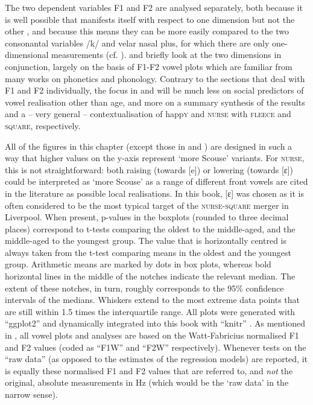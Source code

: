 \largerpage
The two dependent variables F1 and F2 are analysed separately, both because it is well possible that  manifests itself with respect to one dimension but not the other \parencite[cf.][]{harrington2006}, and because this means they can be more easily compared to the two consonantal variables /k/ and velar nasal plus, for which there are only one-dimensional measurements (cf. ).
 and  briefly look at the two dimensions in conjunction, largely on the basis of F1-F2 vowel plots which are familiar from many works on phonetics and phonology.
Contrary to the sections that deal with F1 and F2 individually, the focus in  and  will be much less on social predictors of vowel realisation other than age, and more on a summary synthesis of the  results and a -- very general -- contextualisation of happ\textsc{y} and \textsc{nurse} with \textsc{fleece} and \textsc{square}, respectively.

\largerpage
All of the figures in this chapter (except those in  and ) are designed in such a way that higher values on the y-axis represent `more Scouse' variants.
For \textsc{nurse}, this is not straightforward: both raising (towards [e]) or lowering (towards [ɛ]) could be interpreted as \enquote*{more Scouse} as a range of different front vowels are cited in the literature as possible local realisations.
In this book, [ɛ] was chosen as it is often considered to be the most typical target of the \textsc{nurse}-\textsc{square} merger in Liverpool.
When present, p-values in the boxplots (rounded to three decimal places) correspond to t-tests comparing the oldest to the middle-aged, and the middle-aged to the youngest group.
The value that is horizontally centred is always taken from the t-test comparing means in the oldest and the youngest group.
Arithmetic means are marked by dots in box plots, whereas bold horizontal lines in the middle of the notches indicate the relevant median.
The extent of these notches, in turn, roughly corresponds to the 95\% confidence intervals of the medians.
Whiskers extend to the most extreme data points that are still within 1.5 times the interquartile range.
All plots were generated with ``ggplot2'' \parencite{ggplot2} and dynamically integrated into this book with ``knitr'' \parencite{knitr}.
As mentioned in , all vowel plots and analyses are based on the Watt-Fabricius normalised F1 and F2 values (coded as ``F1W'' and ``F2W'' respectively).
Whenever tests on the ``raw data'' (as opposed to the estimates of the regression models) are reported, it is equally these normalised F1 and F2 values that are referred to, and \emph{not} the original, absolute measurements in Hz (which would be the `raw data' in the narrow sense).

